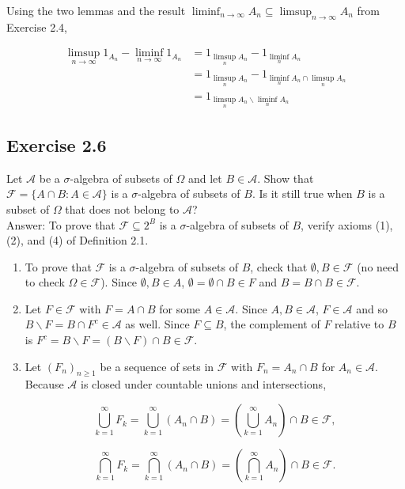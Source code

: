 \documentclass{article}
\begin{document}
Using the two lemmas and the result $\liminf_{n\rightarrow \infty} A_n \subseteq \limsup_{n\rightarrow \infty} A_n$ from Exercise 2.4,

\begin{align*}
\limsup_{n \rightarrow \infty} 1_{A_n} - \liminf_{n \rightarrow \infty} 1_{A_n} 
&=  1_{\limsup_n A_n} - 1_{\liminf_n A_n} \\
&= 1_{\limsup_{n} A_n} - 1_{\liminf_{n} A_n \cap \limsup_{n} A_n} \\
&= 1_{\limsup_{n} A_n \backslash \liminf_{n} A_n}
\end{align*}


\subsection*{Exercise 2.6}

Let $\mathcal{A}$ be a $\sigma$-algebra of subsets of $\Omega$ and let $B \in \mathcal{A}$. Show that $\mathcal{F} = \{A \cap B : A \in \mathcal{A}\}$ is a $\sigma$-algebra of subsets of $B$. Is it still true when $B$ is a
subset of $\Omega$ that does not belong to $\mathcal{A}$?\\

Answer: To prove that $\mathcal{F}\subseteq 2^B$ is a $\sigma$-algebra of subsets of $B$, verify axioms (1), (2), and (4) of Definition 2.1.

\begin{enumerate}
\item To prove that $\mathcal{F}$ is a $\sigma$-algebra of subsets of $B$, check that $\emptyset, B \in \mathcal{F}$ (no need to check $\Omega \in \mathcal{F}$). Since $\emptyset, B \in A$, $\emptyset = \emptyset\cap B \in F$ and $B = B\cap B \in \mathcal{F}$. 

\item Let $F \in \mathcal{F}$ with $F = A\cap B$ for some $A \in \mathcal{A}$. Since $A,B \in \mathcal{A}$, $F \in \mathcal{A}$ and so $B \backslash F = B \cap F^c \in \mathcal{A}$ as well. Since $F \subseteq B$, the complement of $F$ relative to $B$ is $F^c = B \backslash F =  (B\backslash F) \cap B \in \mathcal{F}$.


\item Let $(F_n)_{n\geq 1}$ be a sequence of sets in $\mathcal{F}$ with $F_n = A_n \cap B$ for $A_n \in \mathcal{A}$. Because $\mathcal{A}$ is closed under countable unions and intersections,

$$
\bigcup_{k=1}^\infty F_k = \bigcup_{k=1}^\infty (A_n \cap B) = \left(\bigcup_{k=1}^\infty A_n\right) \cap B \in \mathcal{F},
$$

$$
\bigcap_{k=1}^\infty F_k = \bigcap_{k=1}^\infty (A_n \cap B) = \left(\bigcap_{k=1}^\infty A_n\right) \cap B \in \mathcal{F}.
$$
\end{enumerate}
\end{document}
